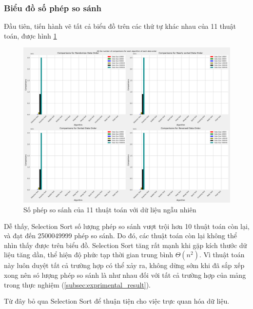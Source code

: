 \subsubsection{Biểu đồ số phép so sánh}

Đầu tiên, tiến hành vẽ tất cả biểu đồ trên các thứ tự khác nhau của 11 thuật toán, được hình \ref{fig:all_the_number_of_comparisons_for_each_algorithm_of_each_data_order}

\begin{figure}[H]
    \centering
    \includegraphics[width=\textwidth]{exprimental_result/images/all_the_number_of_comparisons_for_each_algorithm_of_each_data_order.png}
    \caption{Số phép so sánh của 11 thuật toán với dữ liệu ngẫu nhiên}
    \label{fig:all_the_number_of_comparisons_for_each_algorithm_of_each_data_order}
\end{figure}

Dễ thấy, Selection Sort số lượng phép so sánh vượt trội hơn 10 thuật toán còn lại, và đạt đến 2500049999 phép so sánh. Do đó, các thuật toán còn lại không thể nhìn thấy được trên biểu đồ. Selection Sort tăng rất mạnh khi gặp kích thước dữ liệu tăng dần, thể hiện độ phức tạp thời gian trung bình $\Theta(n^2)$. Vì thuật toán này luôn duyệt tất cả trường hợp có thể xảy ra, không dừng sớm khi đã sắp xếp xong nên só lượng phép so sánh là như nhau đối với tất cả trường hợp của mảng trong thực nghiệm (\ref{subsec:exprimental_result}).  

Từ đây bỏ qua Selection Sort để thuận tiện cho việc trực quan hóa dữ liệu.


